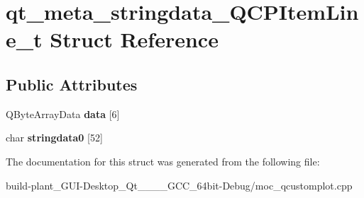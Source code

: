 \hypertarget{structqt__meta__stringdata__QCPItemLine__t}{}\section{qt\+\_\+meta\+\_\+stringdata\+\_\+\+Q\+C\+P\+Item\+Line\+\_\+t Struct Reference}
\label{structqt__meta__stringdata__QCPItemLine__t}
\subsection*{Public Attributes}
\begin{DoxyCompactItemize}
\item 
\mbox{\label{structqt__meta__stringdata__QCPItemLine__t_a4caaf475c8c9a2899091e373fb1c6d49}} 
Q\+Byte\+Array\+Data {\bfseries data} \mbox{[}6\mbox{]}
\item 
\mbox{\label{structqt__meta__stringdata__QCPItemLine__t_a35c5e2ac8b06d8035260983dc8b9dafa}} 
char {\bfseries stringdata0} \mbox{[}52\mbox{]}
\end{DoxyCompactItemize}


The documentation for this struct was generated from the following file\+:\begin{DoxyCompactItemize}
\item 
build-\/plant\+\_\+\+G\+U\+I-\/\+Desktop\+\_\+\+Qt\+\_\+\_\+\_\+\_\+\+G\+C\+C\+\_\+64bit-\/\+Debug/moc\+\_\+qcustomplot.\+cpp\end{DoxyCompactItemize}
